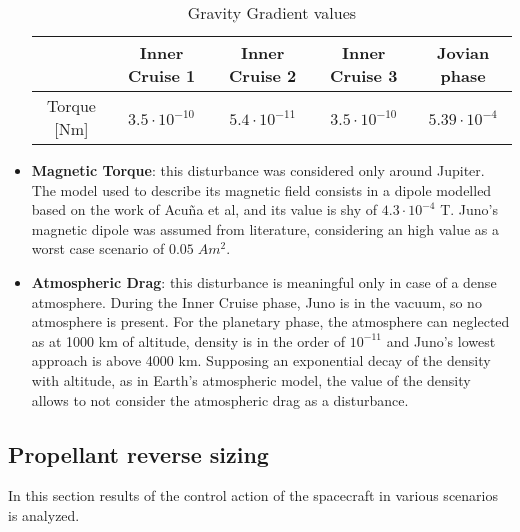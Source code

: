 \begin{itemize}
    \begin{table}[H]
        \renewcommand{\arraystretch}{1.3}
        \centering
        \begin{tabular}{|c|c|c|c|c|}
            \hline
            &\textbf{Inner Cruise 1} & \textbf{Inner Cruise 2} & \textbf{Inner Cruise 3} & \textbf{Jovian phase} \\
            \hline
            \hline
             Torque [Nm] & $3.5 \cdot 10^{-10}$ & $5.4 \cdot 10^{-11}$ & $3.5 \cdot 10^{-10}$ & $5.39 \cdot 10^{-4}$ \\
            \hline
        \end{tabular}
        \caption{Gravity Gradient values}
        \label{table:GGG}
    \end{table}
    
    \item \textbf{Magnetic Torque}: this disturbance was considered only around Jupiter. The model used to describe its magnetic field consists in a dipole modelled based on the work of Acuña et al\cite{jupiter_mag_field}, and its value is shy of $4.3\cdot 10^{-4}$ T. Juno's magnetic dipole was assumed from literature, considering an high value as a worst case scenario of $0.05 \; Am^2$.
    
    \item \textbf{Atmospheric Drag}: this disturbance is meaningful only in case of a dense atmosphere. During the Inner Cruise phase, Juno is in the vacuum, so no atmosphere is present. For the planetary phase, the atmosphere can neglected as at 1000 km of altitude, density is in the order of $10^{-11}$ and Juno's lowest approach is above 4000 km. Supposing an exponential decay of the density with altitude, as in Earth's atmospheric model, the value of the density allows to not consider the atmospheric drag as a disturbance\cite{jupiter_density}.
    
        
\end{itemize}

\subsection{Propellant reverse sizing}
\label{subsec:prop_rev_sizing}

In this section results of the control action of the spacecraft in various scenarios is analyzed.

